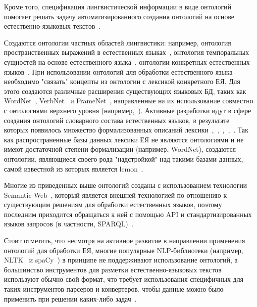 Кроме того, спецификация лингвистической информации в виде онтологий помогает решать задачу автоматизированного создания онтологий на основе естественно-языковых текстов~\cite{SHAMSFARD200417}.

Создаются онтологии частных областей лингвистики: например, онтология пространственных выражений в естественных языках~\cite{BATEMAN20101027}, онтология темпоральных сущностей на основе естественного языка~\cite{Moens_1987}, онтологии конкретных естественных языков~\cite{Dobrov_2018}.
При использовании онтологий для обработки естественного языка необходимо "связать"{} концепты из онтологии с лексикой конкретного ЕЯ.
Для этого создаются различные расширения существующих языковых БД, таких как WordNet~\cite{wordnet}, VerbNet~\cite{verbnet} и FrameNet~\cite{framenet}, направленные на их использование совместно с онтологиями верхнего уровня (например,~\cite{pease_fellbaum_2010}).
Активные разработки идут в сфере создания онтологий словарного состава естественных языков, в результате которых появилось множество формализованных описаний лексики~\cite{matsukawa-yokota-1991-development},~\cite{calzolari_1991},~\cite{buitelaar2006linginfo},~\cite{Cimiano2007LexOntoAM},~\cite{buitelaar_2006}.
Так как распространенные базы данных лексики ЕЯ не являются онтологиями и не имеют достаточной степени формализации (например, WordNet), создаются онтологии, являющиеся своего рода "надстройкой"{} над такими базами данных, самой известной из которых является lemon~\cite{McCrae_2012}.

Многие из приведенных выше онтологий созданы с использованием технологии Semantic Web~\cite{sem_web}, который является внешней технологией по отношению к существующим решениям для обработки естественных языков, поэтому последним приходится обращаться к ней с помощью API и стандартизированных языков запросов (в частности, SPARQL)~\cite{Bouayad_2014}.

Стоит отметить, что несмотря на активное развитие в направлении применения онтологий для обработки ЕЯ, многие популярные NLP-библиотеки (например, NLTK~\cite{nltk} и spaCy~\cite{spacy}) в принципе не поддерживают использование онтологий, а большинство инструментов для разметки естественно-языковых текстов используют обычно свой формат, что требует использования специфичных для таких инструментов парсеров и конвертеров, чтобы данные можно было применить при решении каких-либо задач~\cite[p.~3]{Erekhinskaya2020TenWO}.

